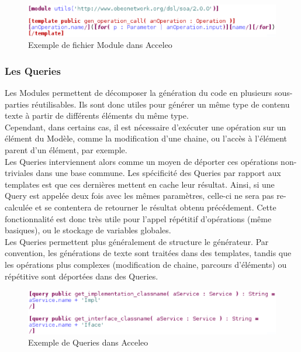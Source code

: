 \begin{figure}[htb]
  \centering
  \includegraphics[scale=0.6]{img/screen_template.eps}
  \caption{Exemple de fichier Module dans Acceleo}
  \label{fig:acc_module}
\end{figure}


\subsubsection{Les Queries}

Les Modules permettent de décomposer la génération du code en plusieurs sous-parties réutilisables. Ils sont donc utiles pour générer un même type de contenu texte à partir de différents éléments du même type.\\
Cependant, dans certains cas, il est nécessaire d'exécuter une opération sur un élément du Modèle, comme la modification d'une chaine, ou l'accès à l'élément parent d'un élément, par exemple.\\
Les Queries interviennent alors comme un moyen de déporter ces opérations non-triviales dans une base commune. Les spécificité des Queries par rapport aux templates est que ces dernières mettent en cache leur résultat. Ainsi, si une Query est appelée deux fois avec les mêmes paramètres, celle-ci ne sera pas re-calculée et se contentera de retourner le résultat obtenu précédement. Cette fonctionnalité est donc très utile pour l'appel répétitif d'opérations (même basiques), ou le stockage de variables globales.\\
Les Queries permettent plus généralement de structure le générateur. Par convention, les générations de texte sont traitées dans des templates, tandis que les opérations plus complexes (modification de chaine, parcours d'éléments) ou répétitive sont déportées dans des Queries.

\begin{figure}[htb]
  \centering
  \includegraphics[scale=0.6]{img/screen_query.eps}
  \caption{Exemple de Queries dans Acceleo}
  \label{fig:acc_module}
\end{figure}

